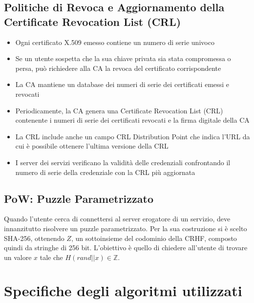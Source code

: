         
        \subsection{Politiche di Revoca e Aggiornamento della Certificate Revocation List (CRL)}
            \begin{itemize}
                \item Ogni certificato X.509 emesso contiene un numero di serie univoco
    
                \item Se un utente sospetta che la sua chiave privata sia stata compromessa o persa, può richiedere alla CA la revoca del certificato corrispondente
    
                \item La CA mantiene un database dei numeri di serie dei certificati emessi e revocati
    
                \item Periodicamente, la CA genera una Certificate Revocation List (CRL) contenente i numeri di serie dei certificati revocati e la firma digitale della CA
    
                \item La CRL include anche un campo CRL Distribution Point che indica l'URL da cui è possibile ottenere l'ultima versione della CRL
    
                \item I server dei servizi verificano la validità delle credenziali confrontando il numero di serie della credenziale con la CRL più aggiornata
            \end{itemize}

        \subsection{PoW: Puzzle Parametrizzato}
            Quando l'utente cerca di connettersi al server erogatore di un servizio, deve innanzitutto risolvere un puzzle parametrizzato.
            Per la sua costruzione si è scelto SHA-256, ottenendo $Z$, un sottoinsieme del codominio della CRHF, composto quindi da stringhe di 256 bit.
            L’obiettivo è quello di chiedere all'utente di trovare un valore $x$ tale che $H(rand||x) \in \mathbb{Z}$.
            

    \section{Specifiche degli algoritmi utilizzati}
